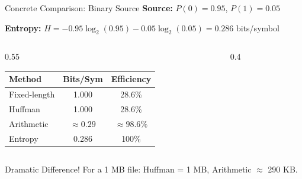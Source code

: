 \documentclass[aspectratio=169,12pt]{beamer}
\begin{document}
\begin{frame}{Concrete Comparison: Binary Source}
    \textbf{Source:} $P(0) = 0.95$, $P(1) = 0.05$
    
    \vspace{0.3cm}
    \textbf{Entropy:} $H = -0.95\log_2(0.95) - 0.05\log_2(0.05) = 0.286$ bits/symbol
    
    \vspace{0.3cm}
    \begin{columns}
        \begin{column}{0.55\textwidth}
            \begin{center}
                \begin{tabular}{l|c|c}
                    \toprule
                    \textbf{Method} & \textbf{Bits/Sym} & \textbf{Efficiency} \\
                    \midrule
                    Fixed-length & 1.000 & 28.6\% \\
                    Huffman & 1.000 & 28.6\% \\
                    Arithmetic & $\approx 0.29$ & $\approx 98.6\%$ \\
                    Entropy & 0.286 & 100\% \\
                    \bottomrule
                \end{tabular}
            \end{center}
        \end{column}
        \begin{column}{0.4\textwidth}
            \begin{center}
            \end{center}
        \end{column}
    \end{columns}
    
    \vspace{0.3cm}
    \begin{alertblock}{Dramatic Difference!}
        For a 1 MB file: Huffman = 1 MB, Arithmetic $\approx$ 290 KB.
    \end{alertblock}
\end{frame}
\end{document}
